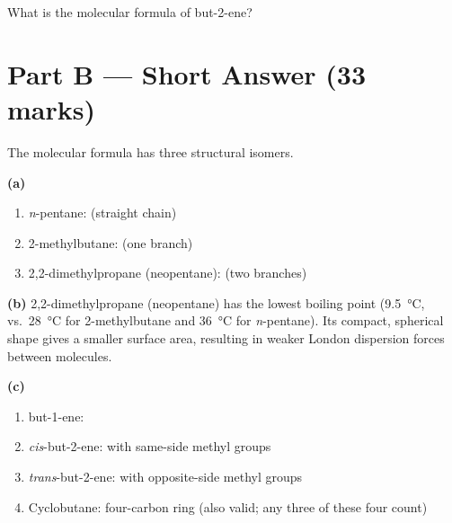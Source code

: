 \documentclass[addpoints]{exam}
\begin{document}
\begin{questions}
\question[1] What is the molecular formula of but-2-ene?
\begin{choices}
    \choice {}
    \correctchoice {}
    \choice {}
    \choice {}
\end{choices}


\section*{Part B --- Short Answer (33 marks)}

\question The molecular formula  has three structural isomers.
\begin{solution}[10cm]
\textbf{(a)}
\begin{enumerate}
    \item \textit{n}-pentane:  (straight chain)
    \item 2-methylbutane:  (one branch)
    \item 2,2-dimethylpropane (neopentane):  (two branches)
\end{enumerate}

\textbf{(b)} 2,2-dimethylpropane (neopentane) has the lowest boiling point (\SI{9.5}{\celsius},
vs.\ \SI{28}{\celsius} for 2-methylbutane and \SI{36}{\celsius} for \textit{n}-pentane). Its
compact, spherical shape gives a smaller surface area, resulting in weaker London dispersion forces
between molecules.

\textbf{(c)}
\begin{enumerate}
    \item but-1-ene: 
    \item \textit{cis}-but-2-ene:  with same-side methyl groups
    \item \textit{trans}-but-2-ene:  with opposite-side methyl groups
    \item Cyclobutane: four-carbon ring (also valid; any three of these four count)
\end{enumerate}
\end{solution}


\end{questions}
\end{document}
